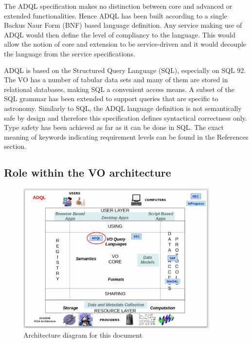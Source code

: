 \documentclass[11pt,a4paper]{ivoa}
\begin{document}
The ADQL specification makes no distinction between core and advanced or
extended functionalities. Hence ADQL has been built according to a single
Backus Naur Form (BNF) based language definition. Any service making use of ADQL would
then define the level of compliancy to the language. This would allow the
notion of core and extension to be service-driven and it would decouple the
language from the service specifications.

ADQL is based on the Structured Query Language (SQL), especially on SQL 92. The
VO has a number of tabular data sets and many of them are stored in relational
databases, making SQL a convenient access means. A subset of the SQL grammar
has been extended to support queries that are specific to astronomy. Similarly
to SQL, the ADQL language definition is not semantically safe by design and
therefore this specification defines syntactical correctness only. Type safety
has been achieved as far as it can be done in SQL. The exact meaning of keywords
indicating requirement levels can be found in the References section.

\clearpage
\subsection{Role within the VO architecture}
\label{sec:role}

\begin{figure}
\centering
\includegraphics[width=0.9\textwidth]{ADQL-archdiag.png}
\caption{Architecture diagram for this document}
\label{fig:archdiag}
\end{figure}
\end{document}
